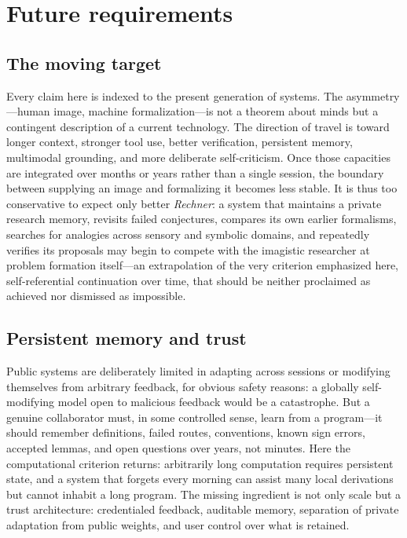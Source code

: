 \documentclass[
  aps,
  reprint,
  superscriptaddress,
  floatfix,
  nofootinbib,
  longbibliography
]{revtex4-2}
\begin{document}
\section{Future requirements}
\label{sec:future}

\subsection{The moving target}

Every claim here is indexed to the present generation of systems. The
asymmetry---human image, machine formalization---is not a theorem about minds but
a contingent description of a current technology. The direction of travel is
toward longer context, stronger tool use, better verification, persistent memory,
multimodal grounding, and more deliberate self-criticism. Once those capacities
are integrated over months or years rather than a single session, the boundary
between supplying an image and formalizing it becomes less stable. It is thus too
conservative to expect only better \emph{Rechner}: a system that maintains a
private research memory, revisits failed conjectures, compares its own earlier
formalisms, searches for analogies across sensory and symbolic domains, and
repeatedly verifies its proposals may begin to compete with the imagistic
researcher at problem formation itself---an extrapolation of the very criterion
emphasized here, self-referential continuation over time, that should be neither
proclaimed as achieved nor dismissed as impossible.

\subsection{Persistent memory and trust}

Public systems are deliberately limited in adapting across sessions or modifying
themselves from arbitrary feedback, for obvious safety reasons: a globally
self-modifying model open to malicious feedback would be a catastrophe. But a
genuine collaborator must, in some controlled sense, learn from a program---it
should remember definitions, failed routes, conventions, known sign errors,
accepted lemmas, and open questions over years, not minutes. Here the
computational criterion returns: arbitrarily long computation requires persistent
state, and a system that forgets every morning can assist many local derivations
but cannot inhabit a long program. The missing ingredient is not only scale but a
trust architecture: credentialed feedback, auditable memory, separation of
private adaptation from public weights, and user control over what is retained.
\end{document}
